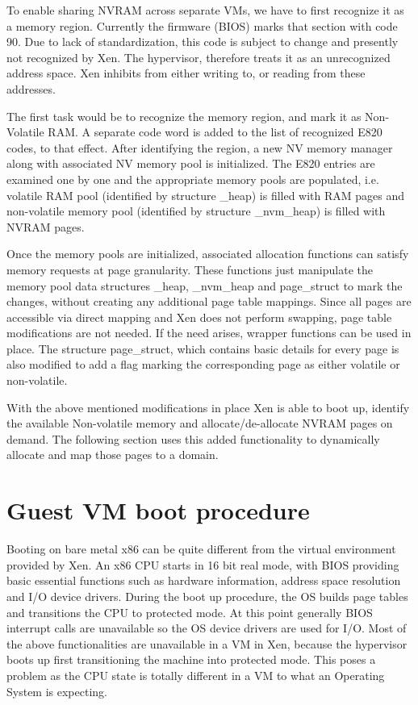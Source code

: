 To enable sharing NVRAM across separate VMs, we have to first recognize it as a memory region. Currently the firmware (BIOS) marks that section with code 90. Due to lack of standardization, this code is subject to change and presently not recognized by Xen. The hypervisor, therefore treats it as an unrecognized address space. Xen inhibits from either writing to, or reading from these addresses. 

 

The first task would be to recognize the memory region, and mark it as Non-Volatile RAM. A separate code word is added to the list of recognized E820 codes, to that effect. After identifying the region, a new NV memory manager along with associated NV memory pool is initialized. The E820 entries are examined one by one and the appropriate memory pools are populated, i.e. volatile RAM pool (identified by structure \_heap) is filled with RAM pages and non-volatile memory pool (identified by structure \_nvm\_heap) is filled with NVRAM pages. 

 

Once the memory pools are initialized, associated allocation functions can satisfy memory requests at page granularity. These functions just manipulate the memory pool data structures \_heap, \_nvm\_heap and page\_struct to mark the changes, without creating any additional page table mappings. Since all pages are accessible via direct mapping and Xen does not perform swapping, page table modifications are not needed. If the need arises, wrapper functions can be used in place. The structure page\_struct, which contains basic details for every page is also modified to add a flag marking the corresponding page as either volatile or non-volatile.  

 

With the above mentioned modifications in place Xen is able to boot up, identify the available Non-volatile memory and allocate/de-allocate NVRAM pages on demand. The following section uses this added functionality to dynamically allocate and map those pages to a domain. 

 

\section{Guest VM boot procedure}

Booting on bare metal x86 can be quite different from the virtual environment provided by Xen. An x86 CPU starts in 16 bit real mode, with BIOS providing basic essential functions such as hardware information, address space resolution and I/O device drivers. During the boot up procedure, the OS builds page tables and transitions the CPU to protected mode. At this point generally BIOS interrupt calls are unavailable so the OS device drivers are used for I/O. Most of the above functionalities are unavailable in a VM in Xen, because the hypervisor boots up first transitioning the machine into protected mode. This poses a problem as the CPU state is totally different in a VM to what an Operating System is expecting. 

